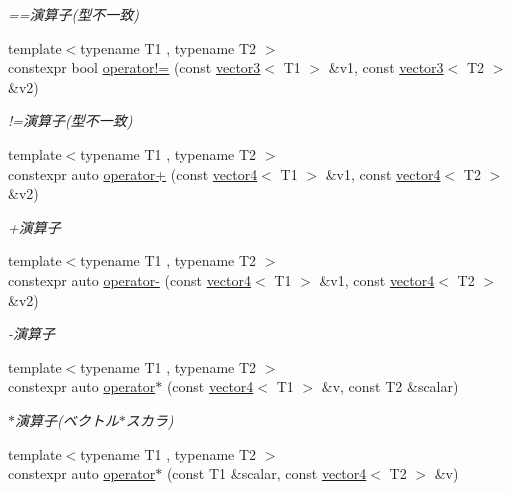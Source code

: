 \begin{DoxyCompactItemize}
\begin{DoxyCompactList}\small\item\em ==演算子(型不一致) \end{DoxyCompactList}\item 
{\footnotesize template$<$typename T1 , typename T2 $>$ }\\constexpr bool \mbox{\hyperlink{namespacesaki_ae8393ad670f8bb199a92d4287bb1bf3a}{operator!=}} (const \mbox{\hyperlink{classsaki_1_1vector3}{vector3}}$<$ T1 $>$ \&v1, const \mbox{\hyperlink{classsaki_1_1vector3}{vector3}}$<$ T2 $>$ \&v2)
\begin{DoxyCompactList}\small\item\em !=演算子(型不一致) \end{DoxyCompactList}\item 
{\footnotesize template$<$typename T1 , typename T2 $>$ }\\constexpr auto \mbox{\hyperlink{namespacesaki_aba02830a0fe4fd92a264f80bd5f6cd65}{operator+}} (const \mbox{\hyperlink{classsaki_1_1vector4}{vector4}}$<$ T1 $>$ \&v1, const \mbox{\hyperlink{classsaki_1_1vector4}{vector4}}$<$ T2 $>$ \&v2)
\begin{DoxyCompactList}\small\item\em +演算子 \end{DoxyCompactList}\item 
{\footnotesize template$<$typename T1 , typename T2 $>$ }\\constexpr auto \mbox{\hyperlink{namespacesaki_a9b9369c0656bd3b8b940eadf027b41f3}{operator-\/}} (const \mbox{\hyperlink{classsaki_1_1vector4}{vector4}}$<$ T1 $>$ \&v1, const \mbox{\hyperlink{classsaki_1_1vector4}{vector4}}$<$ T2 $>$ \&v2)
\begin{DoxyCompactList}\small\item\em -\/演算子 \end{DoxyCompactList}\item 
{\footnotesize template$<$typename T1 , typename T2 $>$ }\\constexpr auto \mbox{\hyperlink{namespacesaki_a0fe5418c09468a2435c0a8a85a941174}{operator$\ast$}} (const \mbox{\hyperlink{classsaki_1_1vector4}{vector4}}$<$ T1 $>$ \&v, const T2 \&scalar)
\begin{DoxyCompactList}\small\item\em $\ast$演算子(ベクトル$\ast$スカラ) \end{DoxyCompactList}\item 
{\footnotesize template$<$typename T1 , typename T2 $>$ }\\constexpr auto \mbox{\hyperlink{namespacesaki_ad1caaaf5b1af879f2d546a4b2e10974e}{operator$\ast$}} (const T1 \&scalar, const \mbox{\hyperlink{classsaki_1_1vector4}{vector4}}$<$ T2 $>$ \&v)

\end{DoxyCompactItemize}
